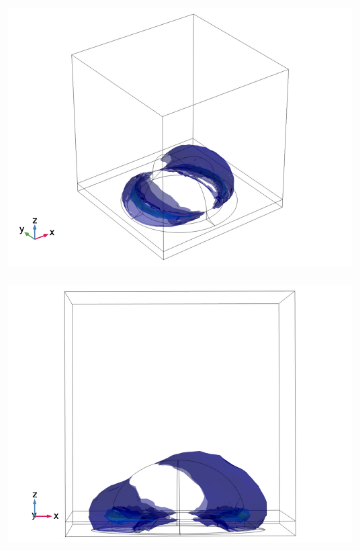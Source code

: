 \begin{figure}[h]
    \begin{subfigure}{0.32\textwidth}
        \centering
        \includegraphics[width=\linewidth, trim=0.4cm 0 1.5cm 0, clip]{figures/ch4/S6/normE/Sample6_nomE_wl585_phi0_TM.png}
        \caption{}
    \end{subfigure}
    \begin{subfigure}{0.33\textwidth}
        \centering
        \includegraphics[width=\linewidth, trim=0.6cm 0 1.6cm 0, clip]{figures/ch4/S6/normE/Sample6_nomE_wl585_phi0_TM_yawayfromviewer.png}
        \caption{}
    \end{subfigure}
    \begin{subfigure}{0.33\textwidth}

\end{subfigure}
\end{figure}
